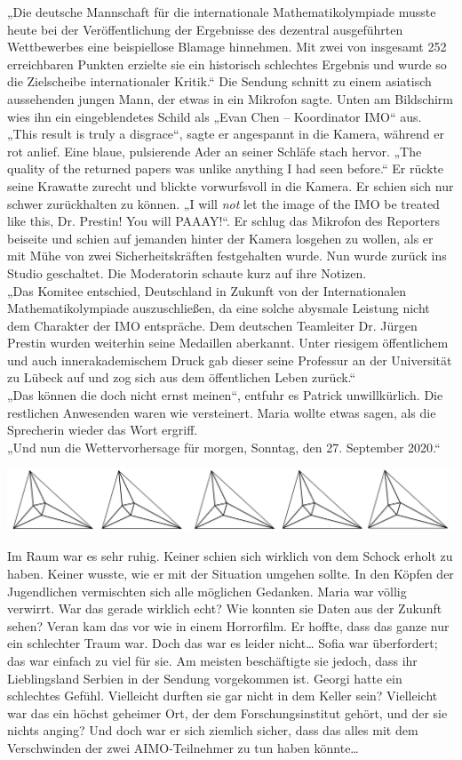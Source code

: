 \documentclass[oneside]{memoir}
\newcommand{\parasep}{
\bigskip
\bigskip
\begin{center} 
   \includegraphics[scale=.08]{parasep5.jpg} 
\end{center}
\bigskip
\bigskip
}
\begin{document}
„Die deutsche Mannschaft für die internationale Mathematikolympiade musste heute bei der Veröffentlichung der Ergebnisse des dezentral ausgeführten Wettbewerbes eine beispiellose Blamage hinnehmen. Mit zwei von insgesamt 252 erreichbaren Punkten erzielte sie ein historisch schlechtes Ergebnis und wurde so die Zielscheibe internationaler Kritik.“
Die Sendung schnitt zu einem asiatisch aussehenden jungen Mann, der etwas in ein Mikrofon sagte. Unten am Bildschirm wies ihn ein eingeblendetes Schild als „Evan Chen – Koordinator IMO“ aus. \\
„This result is truly a disgrace“, sagte er angespannt in die Kamera, während er rot anlief. Eine blaue, pulsierende Ader an seiner Schläfe stach hervor. „The quality of the returned papers was unlike anything I had seen before.“ Er rückte seine Krawatte zurecht und blickte vorwurfsvoll in die Kamera. Er schien sich nur schwer zurückhalten zu können. „I will \textit{not} let the image of the IMO be treated like this, Dr. Prestin! You will PAAAY!“. Er schlug das Mikrofon des Reporters beiseite und schien auf jemanden hinter der Kamera losgehen zu wollen, als er mit Mühe von zwei Sicherheitskräften festgehalten wurde. Nun wurde zurück ins Studio geschaltet. Die Moderatorin schaute kurz auf ihre Notizen. \\
„Das Komitee entschied, Deutschland in Zukunft von der Internationalen Mathematikolympiade auszuschließen, da eine solche abysmale Leistung nicht dem Charakter der IMO entspräche. Dem deutschen Teamleiter Dr. Jürgen Prestin wurden weiterhin seine Medaillen aberkannt. Unter riesigem öffentlichem und auch innerakademischem Druck gab dieser seine Professur an der Universität zu Lübeck auf und zog sich aus dem öffentlichen Leben zurück.“ \\
„Das können die doch nicht ernst meinen“, entfuhr es Patrick unwillkürlich. Die restlichen Anwesenden waren wie versteinert. Maria wollte etwas sagen, als die Sprecherin wieder das Wort ergriff. \\
„Und nun die Wettervorhersage für morgen, Sonntag, den 27. September 2020.“

     
     \parasep
     
Im Raum war es sehr ruhig. Keiner schien sich wirklich von dem Schock erholt zu haben. Keiner wusste, wie er mit der Situation umgehen sollte. 
In den Köpfen der Jugendlichen vermischten sich alle möglichen Gedanken.
Maria war völlig verwirrt. War das gerade wirklich echt? Wie konnten sie Daten aus der Zukunft sehen?
Veran kam das vor wie in einem Horrorfilm. Er hoffte, dass das ganze nur ein schlechter Traum war. Doch das war es leider nicht\ldots
Sofia war überfordert; das war einfach zu viel für sie. Am meisten beschäftigte sie jedoch, dass ihr Lieblingsland Serbien in der Sendung vorgekommen ist.
Georgi hatte ein schlechtes Gefühl. Vielleicht durften sie gar nicht in dem Keller sein? Vielleicht war das ein höchst geheimer Ort, der dem Forschungsinstitut gehört, und der sie nichts anging? Und doch war er sich ziemlich sicher, dass das alles mit dem Verschwinden der zwei AIMO-Teilnehmer zu tun haben könnte\ldots
\end{document}
